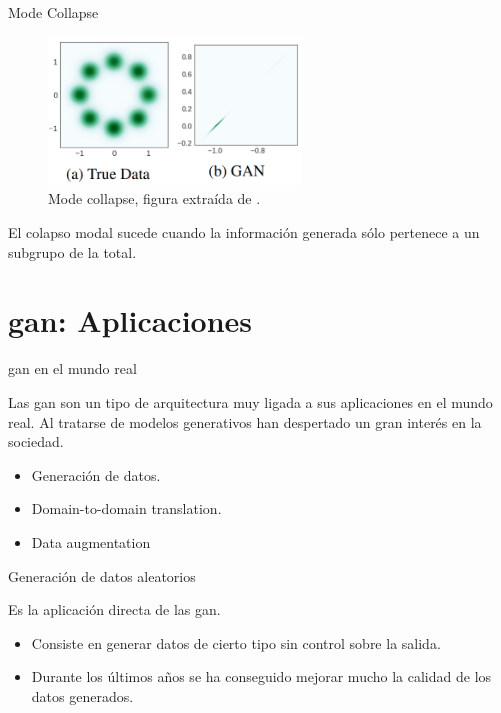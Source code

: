 \begin{frame}{Mode Collapse}

    \begin{figure}
        \centering
        \includegraphics[width=0.6\textwidth]{Slides/figures/GAN/Mode Collapse.png}
        \caption{Mode collapse, figura extraída de \cite{srivastava2017veegan}.}
    \end{figure}

    El \alert{colapso modal} sucede cuando la información generada sólo pertenece a un \alert{subgrupo} de la total.
    
\end{frame}

\section{\gls{gan}: Aplicaciones}

\begin{frame}{\gls{gan} en el mundo real}

    Las \alert{\gls{gan}} son un tipo de arquitectura muy ligada a sus \alert{aplicaciones en el mundo real}. Al tratarse de \alert{modelos generativos} han despertado un gran interés en la sociedad.
    
    \begin{itemize}
        \item Generación de datos.
        \item Domain-to-domain translation.
        \item Data augmentation
    \end{itemize}
\end{frame}

\begin{frame}{Generación de datos aleatorios}

    Es la aplicación \alert{directa} de las \gls{gan}.
    
    \begin{itemize}
        \item Consiste en generar datos de cierto tipo \alert{sin control} sobre la salida.
        \item Durante los últimos años se ha conseguido \alert{mejorar mucho la calidad} de los datos generados.
    \end{itemize}

\end{frame}

